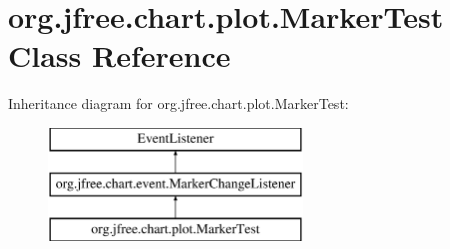 \hypertarget{classorg_1_1jfree_1_1chart_1_1plot_1_1_marker_test}{}\section{org.\+jfree.\+chart.\+plot.\+Marker\+Test Class Reference}
\label{classorg_1_1jfree_1_1chart_1_1plot_1_1_marker_test}
Inheritance diagram for org.\+jfree.\+chart.\+plot.\+Marker\+Test\+:\begin{figure}[H]
\begin{center}
\leavevmode
\includegraphics[height=3.000000cm]{classorg_1_1jfree_1_1chart_1_1plot_1_1_marker_test}
\end{center}
\end{figure}
